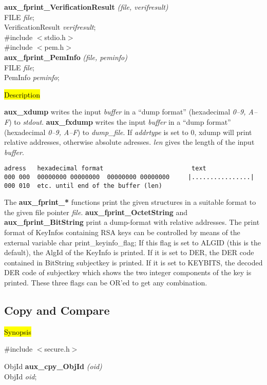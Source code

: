 {\bf aux\_fprint\_VerificationResult} {\em (file, verifresult)} \\
FILE {\em *file}; \\
VerificationResult {\em *verifresult};
\\ [1em]
\#include $<$stdio.h$>$ \\
\#include $<$pem.h$>$ \\ [1em]
{\bf aux\_fprint\_PemInfo} {\em (file, peminfo)} \\
FILE {\em *file}; \\
PemInfo {\em *peminfo};

\hl{Description}

{\bf aux\_xdump} writes the input {\em buffer} in a
``dump format'' (hexadecimal {\em 0--9, A--F}) to {\em stdout}.
{\bf aux\_fxdump} writes the input {\em buffer} in a
``dump format'' (hexadecimal {\em 0--9, A--F}) to {\em dump\_file}.
If {\em addrtype} is set to 0, xdump will print relative addresses,
otherwise absolute adresses.
{\em len} gives the length of the input {\em buffer}.

{\small
\begin{verbatim}
adress   hexadecimal format                        text
000 000  00000000 00000000  00000000 00000000     |................|
000 010  etc. until end of the buffer (len)
\end{verbatim}
}

The {\bf aux\_fprint\_*} functions print the given structures in a suitable
format to the given file pointer {\em file}. {\bf aux\_fprint\_OctetString}
and {\bf aux\_fprint\_BitString} print a dump-format with relative addresses. 
The print format of KeyInfos
containing RSA keys can be controlled by means of the external variable
\bc
{\small
char print\_keyinfo\_flag;
}
\ec
If this flag is set to ALGID (this is the default), the AlgId of the KeyInfo
is printed. If it is set to DER, the DER code contained in BitString subjectkey  
is printed. If it is set to KEYBITS, the decoded DER code of
subjectkey which shows the two integer components of the key is printed. These three
flags can be OR'ed to get any combination.

\subsection{Copy and Compare}
\label{aux_cpy}
\hl{Synopsis}

\#include $<$secure.h$>$
 
ObjId {\bf *aux\_cpy\_ObjId} {\em (oid)} \\
ObjId {\em *oid};

